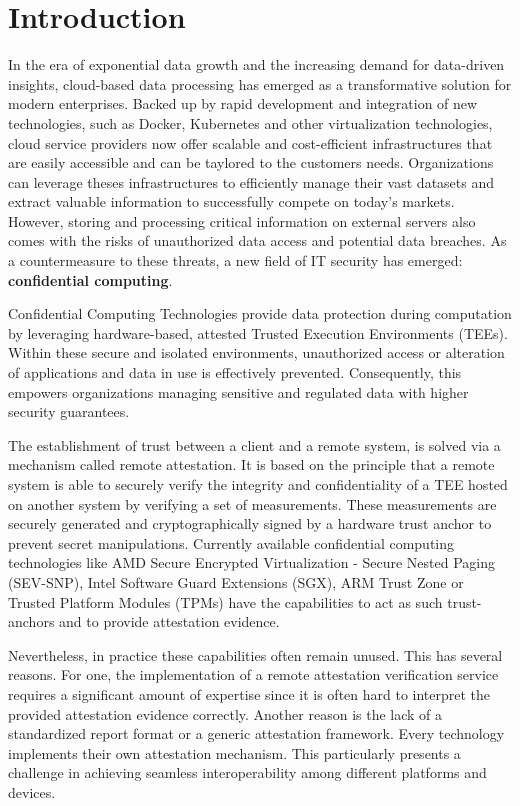 
\chapter{Introduction}\label{chapter:introduction}

In the era of exponential data growth and the increasing demand for data-driven insights, cloud-based data processing has emerged as a transformative solution for modern enterprises. Backed up by rapid development and integration of new technologies, such as Docker, Kubernetes and other virtualization technologies, cloud service providers now offer scalable and cost-efficient infrastructures that are easily accessible and can be taylored to the customers needs. Organizations can leverage theses infrastructures to efficiently manage their vast datasets and extract valuable information to successfully compete on today’s markets. However, storing and processing critical information on external servers also comes with the risks of unauthorized data access and potential data breaches. 
As a countermeasure to these threats, a new field of IT security has emerged: \textbf{confidential computing}.

Confidential Computing Technologies provide data protection during computation by leveraging hardware-based, attested Trusted Execution Environments (TEEs). Within these secure and isolated environments, unauthorized access or alteration of applications and data in use is effectively prevented. Consequently, this empowers organizations managing sensitive and regulated data with higher security guarantees. \cite{ccc_website}

The establishment of trust between a client and a remote system, is solved via a mechanism called remote attestation. It is based on the principle that a remote system is able to securely verify the integrity and confidentiality of a TEE hosted on another system by verifying a set of measurements. These measurements are securely generated and cryptographically signed by a hardware trust anchor to prevent secret manipulations. 
Currently available confidential computing technologies like AMD Secure Encrypted Virtualization - Secure Nested Paging (SEV-SNP), Intel Software Guard Extensions (SGX), ARM Trust Zone or Trusted Platform Modules (TPMs) have the capabilities to act as such trust-anchors and to provide attestation evidence. 

Nevertheless, in practice these capabilities often remain unused. This has several reasons. For one, the implementation of a remote attestation verification service requires a significant amount of expertise since it is often hard to interpret the provided attestation evidence correctly. Another reason is the lack of a standardized report format or a generic attestation framework. Every technology implements their own attestation mechanism. This particularly presents a challenge in achieving seamless interoperability among different platforms and devices. 

